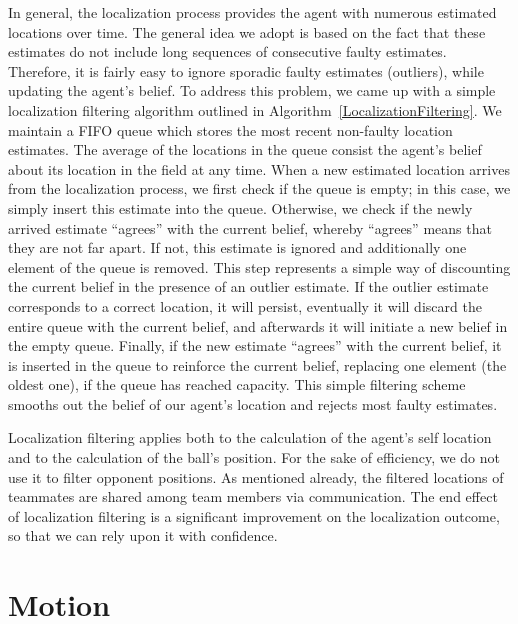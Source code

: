  
In general, the localization process provides the agent with numerous estimated locations over time. The general idea we adopt is based on the fact that these estimates do not include long sequences of consecutive faulty estimates. Therefore, it is fairly easy to ignore sporadic faulty estimates (outliers), while updating the agent's belief.
To address this problem, we came up with a simple localization filtering algorithm outlined in Algorithm~\ref{LocalizationFiltering}. We maintain a FIFO queue which stores the most recent non-faulty location estimates. The average of the locations in the queue consist the agent's belief about its location in the field at any time. When a new estimated location arrives from the localization process, we first check if the queue is empty; in this case, we simply insert this estimate into the queue. Otherwise, we check if the newly arrived estimate ``agrees'' with the current belief, whereby ``agrees'' means that they are not far apart. If not, this estimate is ignored and additionally one element of the queue is removed. This step represents a simple way of discounting the current belief in the presence of an outlier estimate. If the outlier estimate corresponds to a correct location, it will persist, eventually it will discard the entire queue with the current belief, and afterwards it will initiate a new belief in the empty queue. Finally, if the new estimate ``agrees'' with the current belief, it is inserted in the queue to reinforce the current belief, replacing one element (the oldest one), if the queue has reached capacity. This simple filtering scheme smooths out the belief of our agent's location and rejects most faulty estimates.

Localization filtering applies both to the calculation of the agent's self location and to the calculation of the ball's position. For the sake of efficiency, we do not use it to filter opponent positions. As mentioned already, the filtered locations of teammates are shared among team members via communication. The end effect of localization filtering is a significant improvement on the localization outcome, so that we can rely upon it with confidence. 



\section{Motion}
\label{Motions}

